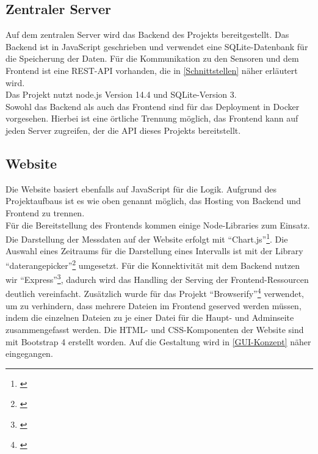 \subsection{Zentraler Server}%
Auf dem zentralen Server wird das Backend des Projekts bereitgestellt.
Das Backend ist in JavaScript geschrieben und verwendet eine SQLite-Datenbank für die Speicherung der Daten.
Für die Kommunikation zu den Sensoren und dem Frontend ist eine REST-API vorhanden, die in \autoref{Schnittstellen} näher erläutert wird.\\
Das Projekt nutzt node.js Version 14.4 und SQLite-Version 3.\\
Sowohl das Backend als auch das Frontend sind für das Deployment in Docker vorgesehen.
Hierbei ist eine örtliche Trennung möglich, das Frontend kann auf jeden Server zugreifen, der die API dieses Projekts bereitstellt.

\subsection{Website}
Die Website basiert ebenfalls auf JavaScript für die Logik.
Aufgrund des Projektaufbaus ist es wie oben genannt möglich, das Hosting von Backend und Frontend zu trennen.\\
Für die Bereitstellung des Frontends kommen einige Node-Libraries zum Einsatz.
Die Darstellung der Messdaten auf der Website erfolgt mit \enquote{Chart.js}\footnote{\cite{chartjs.2020}}.
Die Auswahl eines Zeitraums für die Darstellung eines Intervalls ist mit der Library \enquote{daterangepicker}\footnote{\cite{daterangepicker.2020}} umgesetzt.
Für die Konnektivität mit dem Backend nutzen wir \enquote{Express}\footnote{\cite{express.2020}}, dadurch wird das Handling der Serving der Frontend-Ressourcen deutlich vereinfacht.
Zusätzlich wurde für das Projekt \enquote{Browserify}\footnote{\cite{browserify.2020}} verwendet, um zu verhindern, dass mehrere Dateien im Frontend geserved werden müssen, indem die einzelnen Dateien zu je einer Datei für die Haupt- und Adminseite zusammengefasst werden.
Die HTML- und CSS-Komponenten der Website sind mit Bootstrap 4 erstellt worden.
Auf die Gestaltung wird in \autoref{GUI-Konzept} näher eingegangen.